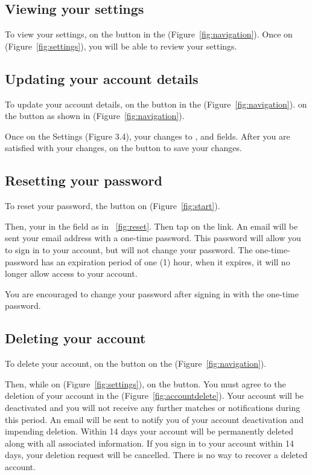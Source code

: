 \subsection{Viewing your settings}
\label{sec:settings}
To view your settings,  on the  button in the  (Figure~\ref{fig:navigation}). Once on  (Figure~\ref{fig:settings}), you will be able to review your settings. 

\subsection{Updating your account details}
\label{sec:account-update}
To update your account details,  on the  button in the  (Figure~\ref{fig:navigation}).   on the  button as shown in (Figure~\ref{fig:navigation}).

Once on the Settings (Figure 3.4),  your changes to ,  and  fields. After you are satisfied with your changes,  on the  button to save your changes.

\subsection{Resetting your password}
\label{sec:reset}
To reset your password,  the  button on  (Figure~\ref{fig:start}).

Then,  your  in the  field as in ~\ref{fig:reset}. Then tap on the  link. An email will be sent your email address with a one-time password.  This password will allow you to sign in to your account, but will not change your password. The one-time-password has an expiration period of one (1) hour, when it expires, it will no longer allow access to your account.

You are encouraged to change your password after signing in with the one-time password.

\subsection{Deleting your account}
\label{sec:account-delete}

To delete your account,  on the  button on the  (Figure~\ref{fig:navigation}).

Then, while on  (Figure~\ref{fig:settings}),  on the  button.  You must agree to the deletion of your account in the  (Figure~\ref{fig:accountdelete}). Your account will be deactivated and you will not receive any further matches or notifications during this period.  An email will be sent to notify you of your account deactivation and impending deletion.  Within 14 days your account will be permanently deleted along with all associated information.  If you sign in to your account within 14 days, your deletion request will be cancelled.  There is no way to recover a deleted account.